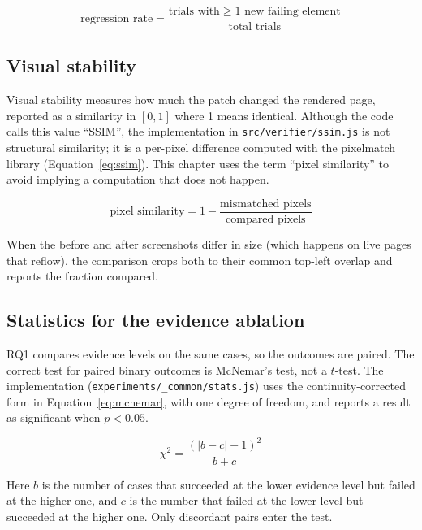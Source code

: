 \documentclass[11pt]{article}
\begin{document}
\begin{equation}
\label{eq:reg}
\text{regression rate} = \frac{\text{trials with} \ge 1 \text{ new failing element}}{\text{total trials}}
\end{equation}

\subsection{Visual stability}

Visual stability measures how much the patch changed the rendered page, reported as a
similarity in $[0,1]$ where 1 means identical. Although the code calls this value
``SSIM'', the implementation in \texttt{src/verifier/ssim.js} is not structural
similarity; it is a per-pixel difference computed with the pixelmatch library
(Equation~\ref{eq:ssim}). This chapter uses the term ``pixel similarity'' to avoid
implying a computation that does not happen.

\begin{equation}
\label{eq:ssim}
\text{pixel similarity} = 1 - \frac{\text{mismatched pixels}}{\text{compared pixels}}
\end{equation}

When the before and after screenshots differ in size (which happens on live pages
that reflow), the comparison crops both to their common top-left overlap and reports
the fraction compared.

\subsection{Statistics for the evidence ablation}

RQ1 compares evidence levels on the same cases, so the outcomes are paired. The
correct test for paired binary outcomes is McNemar's test, not a $t$-test. The
implementation (\texttt{experiments/\_common/stats.js}) uses the continuity-corrected
form in Equation~\ref{eq:mcnemar}, with one degree of freedom, and reports a result
as significant when $p < 0.05$.

\begin{equation}
\label{eq:mcnemar}
\chi^2 = \frac{(\lvert b - c \rvert - 1)^2}{b + c}
\end{equation}

Here $b$ is the number of cases that succeeded at the lower evidence level but failed
at the higher one, and $c$ is the number that failed at the lower level but succeeded
at the higher one. Only discordant pairs enter the test.
\end{document}
